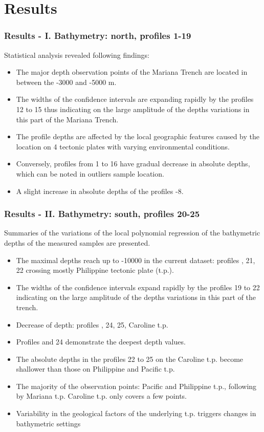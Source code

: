 \documentclass[pdflatex,compress,10pt,
	xcolor={dvipsnames,dvipsnames,svgnames,x11names,table},
	hyperref={colorlinks = true,breaklinks = true, urlcolor = NavyBlue, breaklinks = true}]{beamer}
\begin{document}
\section{Results}
\begin{frame}\frametitle{Results - I. Bathymetry: north, profiles 1-19}
Statistical analysis revealed following findings:
\begin{itemize}
    \item The major depth observation points of the Mariana Trench are located in between the -3000 and -5000 m.
    \item The widths of the confidence intervals are expanding rapidly by the profiles 12 to 15 thus indicating on the large amplitude of the depths variations in this part of the Mariana Trench.
    \item The profile depths are affected by the local geographic features caused by the location on 4 tectonic plates with varying environmental conditions.
    \item Conversely, profiles from 1 to 16 have gradual decrease in absolute depths, which can be noted in outliers sample location. 
    \item A slight increase in absolute depths of the profiles \textnumero {}-8. 
\end{itemize}
\end{frame}
	
\begin{frame}\frametitle{Results - II. Bathymetry: south, profiles 20-25}
Summaries of the variations of the local polynomial regression of the bathymetric depths of the measured samples are presented. \begin{itemize}
    \item The maximal depths reach up to -10000 in the current dataset: profiles , 21, 22 crossing mostly Philippine tectonic plate (t.p.).
    \item The widths of the confidence intervals expand rapidly by the profiles 19 to 22 indicating on the large amplitude of the depths variations in this part of the trench.
    \item Decrease of depth: profiles , 24, 25, Caroline t.p.
    \item Profiles  and 24 demonstrate the deepest depth values. 
    \item The absolute depths in the profiles 22 to 25 on the Caroline t.p. become shallower than those on Philippine and Pacific t.p.
    \item The majority of the observation points: Pacific and Philippine t.p., following by Mariana t.p. Caroline t.p. only covers a few points. 
    \item Variability in the geological factors of the underlying t.p. triggers changes in bathymetric settings
\end{itemize}
\end{frame}	
\end{document}
